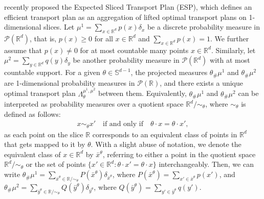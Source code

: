 \citet{liu2025expected} recently proposed the Expected Sliced Transport Plan (ESP), which defines an efficient transport plan as an aggregation of lifted optimal transport plans on 1-dimensional slices. Let $\mu^1=\sum_{x\in\mathbb{R}^d}p(x)\delta_x$ be a discrete probability measure in $\mathcal{P}(\mathbb{R}^d)$, that is, $p(x)\geq 0$ for all $x\in\mathbb{R}^d$ and $\sum_{x\in\mathbb{R}^d}p(x)=1$. We further assume that $p(x)\neq 0$ for at most countable many points $x\in\mathbb{R}^d$. Similarly, let $\mu^2=\sum_{y\in\mathbb{R}^d}q(y)\delta_y$ be another probability measure in $\mathcal{P}(\mathbb{R}^d)$ with at most countable support. For a given $\theta\in\mathbb{S}^{d-1}$, the projected measures $\theta_{\#}\mu^1$ and $\theta_{\#}\mu^2$ are 1-dimensional probability measures in $\mathcal{P}(\mathbb{R})$, and there exists a unique optimal transport plan $\Lambda_\theta^{\mu^1, \mu^2}$ between them. Equivalently, $\theta_{\#}\mu^1$ and $\theta_{\#}\mu^2$ can be interpreted as probability measures over a quotient space $\mathbb{R}^d/\sim_\theta$, where $\sim_\theta$ is defined as follows:
\vspace{-.05in}
\begin{align*}
    x\sim_\theta x'\quad\text{if and only if}\quad\theta\cdot x=\theta \cdot x',
\end{align*}
as each point on the slice $\mathbb{R}$ corresponds to an equivalent class of points in $\mathbb{R}^d$ that gets mapped to it by $\theta$. With a slight abuse of notation, we denote the equivalent class of $x\in\mathbb{R}^d$ by $\bar{x}^\theta$, referring to either a point in the quotient space $\mathbb{R}^d/\sim_\theta$ or the set of points $\{x'\in\mathbb{R}^d:\theta\cdot x'=\theta\cdot x\}$ interchangeably. Then, we can write $\theta_\# \mu^1=\sum_{\bar{x}^\theta\in\mathbb{R}/\sim_\theta}P(\bar{x}^\theta)\delta_{\bar{x}^\theta}$, where $P(\bar{x}^\theta)=\sum_{x'\in\bar{x}^\theta}p(x')$, and $\theta_\# \mu^2=\sum_{\bar{y}^\theta\in\mathbb{R}/\sim_\theta}Q(\bar{y}^\theta)\delta_{\bar{y}^\theta}$, where $Q(\bar{y}^\theta)=\sum_{y'\in\bar{y}^\theta}q(y')$. 

